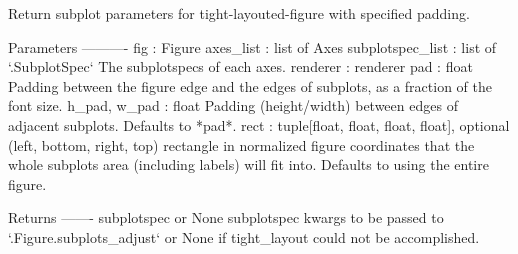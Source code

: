 \begin{DoxyVerb}Return subplot parameters for tight-layouted-figure with specified padding.

Parameters
----------
fig : Figure
axes_list : list of Axes
subplotspec_list : list of `.SubplotSpec`
    The subplotspecs of each axes.
renderer : renderer
pad : float
    Padding between the figure edge and the edges of subplots, as a
    fraction of the font size.
h_pad, w_pad : float
    Padding (height/width) between edges of adjacent subplots.  Defaults to
    *pad*.
rect : tuple[float, float, float, float], optional
    (left, bottom, right, top) rectangle in normalized figure coordinates
    that the whole subplots area (including labels) will fit into.
    Defaults to using the entire figure.

Returns
-------
subplotspec or None
    subplotspec kwargs to be passed to `.Figure.subplots_adjust` or
    None if tight_layout could not be accomplished.
\end{DoxyVerb}
 